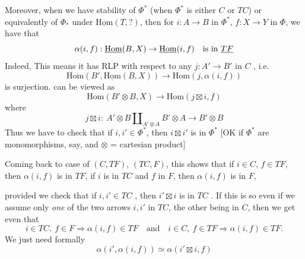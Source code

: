 \documentclass[11pt,a4paper]{article}
\begin{document}
 Moreover, when we have stability of
$\Phi^*$  (when $\Phi^*$ is either $C$ or
$TC$) or equivalently of $\Phi_*$ under $\underline{\mathrm{Hom}}(T, ?)$,
then for $i : A \to B$ in $\Phi^*$, $f : X \to Y$ in $\Phi$,
 we have that 
\[
  \alpha(i,f) :
  \underline{\mathrm{Hom}}(B, X) \to \underline{\mathrm{Hom}}(i, f)
  \quad \text{is in } \emph{TF}
\]
Indeed, This means it has RLP with respect to any $j : A' \to B'$ in $C$
\add{$[\Phi^*]$}, i.e.
\[
  \mathrm{Hom}(B', \underline{\mathrm{Hom}}(B, X)) \longrightarrow
  \mathrm{Hom}(j, \alpha(i,f))
\]
is surjection.  can be viewed as 
\[
  \mathrm{Hom}(B' \otimes B, X) \longrightarrow
  \mathrm{Hom}(j \boxtimes i, f)
\]
where 
\[
  j \boxtimes i : \ A' \otimes B \amalg_{A' \otimes A} B' \otimes A
  \longrightarrow B' \otimes B
\]
 Thus we have to check that if $i, i' \in \Phi^*$, then
$i \boxtimes i'$ is in $\Phi^*$ [OK if $\Phi^*$ are monomorphisms, say, and
$\otimes$ = cartesian product]

Coming back to case of $(C, TF)$, $(TC, F)$, this shows that if $i \in C$,
$f \in TF$, then \struck{\ill{}} $\alpha(i,f)$ is in $TF$,  if
$i$ is in $TC$ and $f$ in $F$, then \struck{\ill{}} $\alpha(i,f)$ is in
$F$,

provided we check that if $i, i' \in TC$ , then
$i' \boxtimes i$ is in $TC$ .
 If this is so even if we assume only \emph{one} of the two
arrows $i, i'$ in $TC$, the other being in $C$, then we get even that
\[
  i \in TC,\ f \in F \Rightarrow \alpha(i,f) \in TF
  \quad\text{and}\quad
  i \in C,\ f \in TF \Rightarrow \alpha(i,f) \in TF .
\]
We just need formally
\[
  \alpha(i', \alpha(i,f)) \simeq \alpha(i' \boxtimes i, f)
\]
\end{document}
